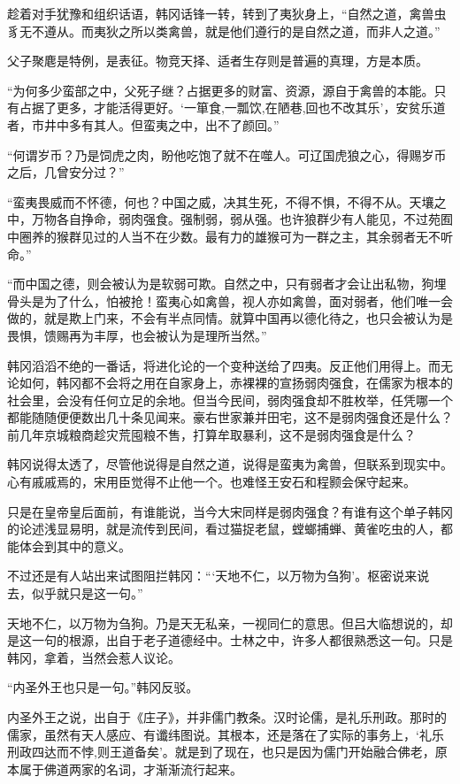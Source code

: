 趁着对手犹豫和组织话语，韩冈话锋一转，转到了夷狄身上，“自然之道，禽兽虫豸无不遵从。而夷狄之所以类禽兽，就是他们遵行的是自然之道，而非人之道。”

父子聚麀是特例，是表征。物竞天择、适者生存则是普遍的真理，方是本质。

“为何多少蛮部之中，父死子继？占据更多的财富、资源，源自于禽兽的本能。只有占据了更多，才能活得更好。‘一箪食,一瓢饮,在陋巷,回也不改其乐’，安贫乐道者，市井中多有其人。但蛮夷之中，出不了颜回。”

“何谓岁币？乃是饲虎之肉，盼他吃饱了就不在噬人。可辽国虎狼之心，得赐岁币之后，几曾安分过？”

“蛮夷畏威而不怀德，何也？中国之威，决其生死，不得不惧，不得不从。天壤之中，万物各自挣命，弱肉强食。强制弱，弱从强。也许狼群少有人能见，不过苑囿中圈养的猴群见过的人当不在少数。最有力的雄猴可为一群之主，其余弱者无不听命。”

“而中国之德，则会被认为是软弱可欺。自然之中，只有弱者才会让出私物，狗埋骨头是为了什么，怕被抢！蛮夷心如禽兽，视人亦如禽兽，面对弱者，他们唯一会做的，就是欺上门来，不会有半点同情。就算中国再以德化待之，也只会被认为是畏惧，馈赐再为丰厚，也会被认为是理所当然。”

韩冈滔滔不绝的一番话，将进化论的一个变种送给了四夷。反正他们用得上。而无论如何，韩冈都不会将之用在自家身上，赤裸裸的宣扬弱肉强食，在儒家为根本的社会里，会没有任何立足的余地。但当今民间，弱肉强食却不胜枚举，任凭哪一个都能随随便便数出几十条见闻来。豪右世家兼并田宅，这不是弱肉强食还是什么？前几年京城粮商趁灾荒囤粮不售，打算牟取暴利，这不是弱肉强食是什么？

韩冈说得太透了，尽管他说得是自然之道，说得是蛮夷为禽兽，但联系到现实中。心有戚戚焉的，宋用臣觉得不止他一个。也难怪王安石和程颢会保守起来。

只是在皇帝皇后面前，有谁能说，当今大宋同样是弱肉强食？有谁有这个单子韩冈的论述浅显易明，就是流传到民间，看过猫捉老鼠，螳螂捕蝉、黄雀吃虫的人，都能体会到其中的意义。

不过还是有人站出来试图阻拦韩冈：“‘天地不仁，以万物为刍狗’。枢密说来说去，似乎就只是这一句。”

天地不仁，以万物为刍狗。乃是天无私亲，一视同仁的意思。但吕大临想说的，却是这一句的根源，出自于老子道德经中。士林之中，许多人都很熟悉这一句。只是韩冈，拿着，当然会惹人议论。

“内圣外王也只是一句。”韩冈反驳。

内圣外王之说，出自于《庄子》，并非儒门教条。汉时论儒，是礼乐刑政。那时的儒家，虽然有天人感应、有谶纬图说。其根本，还是落在了实际的事务上，‘礼乐刑政四达而不悖,则王道备矣’。就是到了现在，也只是因为儒门开始融合佛老，原本属于佛道两家的名词，才渐渐流行起来。

